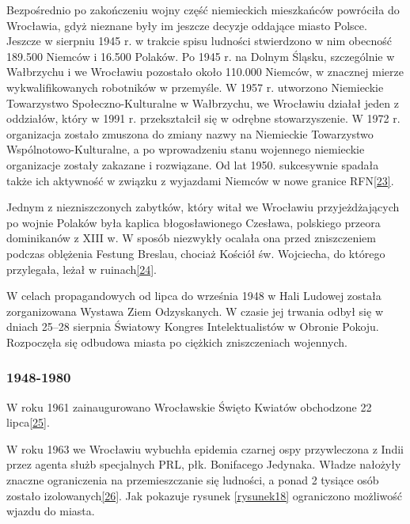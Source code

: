\documentclass{article}
\begin{document}
\vspace{6pt}

\noindent Bezpośrednio po zakończeniu wojny część niemieckich mieszkańców powróciła do Wrocławia, gdyż nieznane były im jeszcze decyzje oddające miasto Polsce. Jeszcze w sierpniu 1945 r. w trakcie spisu ludności stwierdzono w nim obecność 189.500 Niemców i 16.500 Polaków. Po 1945 r. na Dolnym Śląsku, szczególnie w Wałbrzychu i we Wrocławiu pozostało około 110.000 Niemców, w znacznej mierze wykwalifikowanych robotników w przemyśle. W 1957 r. utworzono Niemieckie Towarzystwo Społeczno-Kulturalne w Wałbrzychu, we Wrocławiu działał jeden z oddziałów, który w 1991 r. przekształcił się w odrębne stowarzyszenie. W 1972 r. organizacja zostało zmuszona do zmiany nazwy na Niemieckie Towarzystwo Wspólnotowo-Kulturalne, a po wprowadzeniu stanu wojennego niemieckie organizacje zostały zakazane i rozwiązane. Od lat 1950. sukcesywnie spadała także ich aktywność w związku z wyjazdami Niemców w nowe granice RFN\hyperref[23]{[23]}\label{223}.

\vspace{6pt}

\noindent Jednym z niezniszczonych zabytków, który witał we Wrocławiu przyjeżdżających po wojnie Polaków była kaplica błogosławionego Czesława, polskiego przeora dominikanów z XIII w. W sposób niezwykły ocalała ona przed zniszczeniem podczas oblężenia Festung Breslau, chociaż Kościół św. Wojciecha, do którego przylegała, leżał w ruinach\hyperref[24]{[24]}\label{224}.

\vspace{6pt}

\noindent W celach propagandowych od lipca do września 1948 w Hali Ludowej została zorganizowana Wystawa Ziem Odzyskanych. W czasie jej trwania odbył się w dniach 25–28 sierpnia Światowy Kongres Intelektualistów w Obronie Pokoju. Rozpoczęła się odbudowa miasta po ciężkich zniszczeniach wojennych.

\subsubsection*{1948-1980}
W roku 1961 zainaugurowano Wrocławskie Święto Kwiatów obchodzone 22 lipca\hyperref[25]{[25]}\label{225}.

\vspace{6pt}

\noindent W roku 1963 we Wrocławiu wybuchła epidemia czarnej ospy przywleczona z Indii przez agenta służb specjalnych PRL, płk. Bonifacego Jedynaka. Władze nałożyły znaczne ograniczenia na przemieszczanie się ludności, a ponad 2 tysiące osób zostało izolowanych\hyperref[26]{[26]}\label{226}. Jak pokazuje rysunek \ref{rysunek18} ograniczono możliwość wjazdu do miasta.
\end{document}
